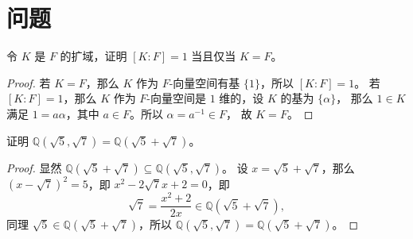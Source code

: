 


\section*{问题}

\begin{problem}
  令 $K$ 是 $F$ 的扩域，证明 $[K:F]=1$ 当且仅当 $K=F$。
\end{problem}
\begin{proof}
  若 $K=F$，那么 $K$ 作为 $F$-向量空间有基 $\{1\}$，所以 $[K:F]=1$。
  若 $[K:F]=1$，那么 $K$ 作为 $F$-向量空间是 $1$ 维的，设 $K$ 的基为 $\{\alpha\}$，
  那么 $1\in K$ 满足 $1=a\alpha$，其中 $a\in F$。所以 $\alpha=a^{-1}\in F$，
  故 $K=F$。
\end{proof}

\begin{problem}
  证明 $\mathbb{Q}(\sqrt{5},\sqrt{7})=\mathbb{Q}(\sqrt{5}+\sqrt{7})$。
\end{problem}
\begin{proof}
  显然 $\mathbb{Q}(\sqrt{5}+\sqrt{7})\subseteq \mathbb{Q}(\sqrt{5},\sqrt{7})$。
  设 $x=\sqrt{5}+\sqrt{7}$，那么 $(x-\sqrt{7})^2=5$，即 $x^2-2\sqrt{7}x+2=0$，即
  \[
    \sqrt{7}=\frac{x^2+2}{2x}\in \mathbb{Q}(\sqrt{5}+\sqrt{7}),
  \]
  同理 $\sqrt{5}\in \mathbb{Q}(\sqrt{5}+\sqrt{7})$，所以 $\mathbb{Q}(\sqrt{5},\sqrt{7})=\mathbb{Q}(\sqrt{5}+\sqrt{7})$。
\end{proof}

